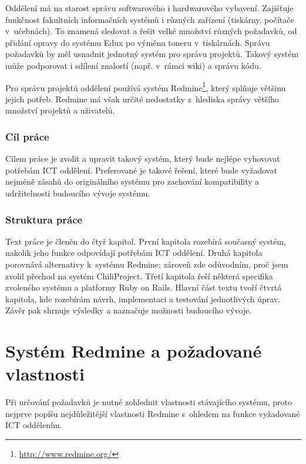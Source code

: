 \documentclass[thesis=B,czech]{FITthesis}[2012/05/02]
\begin{document}
\begin{introduction}

Oddělení   má na starost správu softwarového i hardwarového vybavení. Zajišťuje funkčnost fakultních informačních systémů i různých zařízení (tiskárny, počítače v~učebnách). To znamená sledovat a řešit velké množství různých požadavků, od přidání opravy do systému Edux po výměnu toneru v~tiskárnách. Správu požadavků by měl usnadnit jednotný systém pro správu projektů. Takový systém může podporovat i sdílení znalostí (např. v~rámci \gls{wiki}) a správu kódu.

Pro správu projektů oddělení používá systém Redmine\footnote{\url{http://www.redmine.org/}}, který splňuje většinu jejich potřeb. Redmine má však určité nedostatky z~hlediska správy většího množství projektů a uživatelů.

\subsection{Cíl práce}

Cílem práce je zvolit a upravit takový systém, který bude nejlépe vyhovovat potřebám ICT oddělení. Preferované je takové řešení, které bude vyžadovat nejméně zásahů do originálního systému pro zachování kompatibility a udržitelnosti budoucího vývoje systému.

\subsection{Struktura práce}

Text práce je členěn do čtyř kapitol. První kapitola rozebírá současný systém, nakolik jeho funkce odpovídají potřebám ICT oddělení. Druhá kapitola porovnává alternativy k~systému Redmine; zároveň zde odůvodním, proč jsem zvolil přechod na systém ChiliProject. Třetí kapitola řeší některá specifika zvoleného systému a platformy Ruby on Rails. Hlavní část textu tvoří čtvrtá kapitola, kde rozebírám návrh, implementaci a testování jednotlivých úprav. Závěr pak shrnuje výsledky a naznačuje možnosti budoucího vývoje.

\end{introduction}

\chapter{Systém Redmine a požadované vlastnosti}

Při určování požadavků je nutné zohlednit vlastnosti stávajícího
systému, proto nejprve popíšu nejdůležitější vlastnosti Redmine
s~ohledem na funkce vyžadované ICT oddělením.
\end{document}
